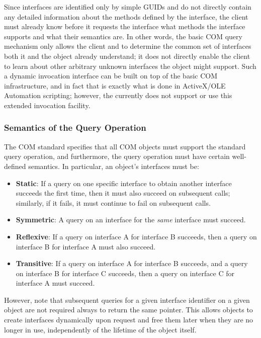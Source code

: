 Since interfaces are identified only by simple GUIDs
and do not directly contain any detailed information
about the methods defined by the interface,
the client must already know before it requests the interface
what methods the interface supports
and what their semantics are.
In other words, the basic COM query mechanism
only allows the client and to determine
the common set of interfaces both it and the object already understand;
it does not directly enable the client
to learn about other arbitrary unknown interfaces the object might support.
Such a dynamic invocation interface
can be built on top of the basic COM infrastructure,
and in fact that is exactly what is done
in ActiveX/OLE Automation scripting;
however, the \oskit{} currently does not support or use
this extended invocation facility.

\subsubsection{Semantics of the Query Operation}

The COM standard specifies that
all COM objects must support the standard query operation,
and furthermore, the query operation must have certain well-defined semantics.
In particular, an object's interfaces must be:

\begin{itemize}
\item	{\bf Static}:
	If a query on one specific interface to obtain another interface
	succeeds the first time, then it must also succeed on subsequent calls;
	similarly, if it fails, it must continue to fail on subsequent calls.
\item	{\bf Symmetric}:
	A query on an interface for the \emph{same} interface must succeed.
\item	{\bf Reflexive}:
	If a query on interface A for interface B succeeds,
	then a query on interface B for interface A must also succeed.
\item	{\bf Transitive}:
	If a query on interface A for interface B succeeds,
	and a query on interface B for interface C succeeds,
	then a query on interface C for interface A must succeed.
\end{itemize}

However,
note that subsequent queries for a given interface identifier on a given object
are not required always to return the same pointer.
This allows objects to create interfaces dynamically upon request
and free them later when they are no longer in use,
independently of the lifetime of the object itself.

